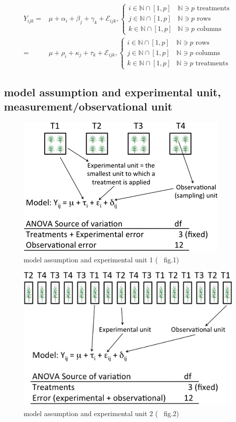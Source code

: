 \documentclass[
]{book}
\theoremstyle{definition}
\theoremstyle{definition}
\theoremstyle{definition}
\theoremstyle{definition}
\theoremstyle{remark}
\begin{document}
\[
\begin{aligned}
Y_{{\scriptscriptstyle ijk}}= & \mu+\alpha_{{\scriptscriptstyle i}}+\beta_{{\scriptscriptstyle j}}+\gamma_{{\scriptscriptstyle k}}+\mathcal{E}_{{\scriptscriptstyle ijk}},\begin{cases}
i\in\mathbb{N}\cap\left[1,p\right] & \mathbb{N}\ni p\text{ treatments}\\
j\in\mathbb{N}\cap\left[1,p\right] & \mathbb{N}\ni p\text{ rows}\\
k\in\mathbb{N}\cap\left[1,p\right] & \mathbb{N}\ni p\text{ columns}
\end{cases}\\
= & \mu+\rho_{{\scriptscriptstyle i}}+\kappa_{{\scriptscriptstyle j}}+\tau_{{\scriptscriptstyle k}}+\mathcal{E}_{{\scriptscriptstyle ijk}},\begin{cases}
i\in\mathbb{N}\cap\left[1,p\right] & \mathbb{N}\ni p\text{ rows}\\
j\in\mathbb{N}\cap\left[1,p\right] & \mathbb{N}\ni p\text{ columns}\\
k\in\mathbb{N}\cap\left[1,p\right] & \mathbb{N}\ni p\text{ treatments}
\end{cases}
\end{aligned}
\]

\subsection{model assumption and experimental unit, measurement/observational unit}\label{model-assumption-and-experimental-unit-measurementobservational-unit}



\begin{figure}
\includegraphics[width=0.5\linewidth]{img/casler2015-fig1} \caption{model assumption and experimental unit 1 (~\textsuperscript{} fig.1)}\label{fig:unnamed-chunk-3}
\end{figure}

\begin{figure}
\includegraphics[width=0.5\linewidth]{img/casler2015-fig2} \caption{model assumption and experimental unit 2 (~\textsuperscript{} fig.2)}\label{fig:unnamed-chunk-4}
\end{figure}
\end{document}
